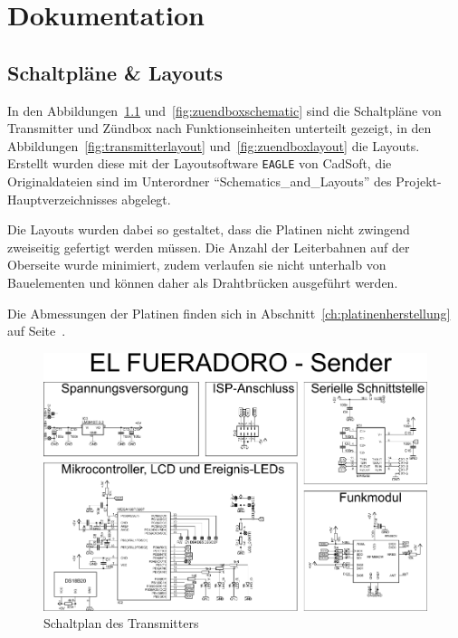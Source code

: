 \documentclass[paper=a4, parskip, numbers=noenddot, toc=listof, headsepline]{scrbook}
\begin{document}
	\part{Dokumentation}
	\label{part:dokumentation}

	\chapter{Schaltpläne \& Layouts}

		In den Abbildungen~\ref{fig:transmitterschematic} und~\ref{fig:zuendboxschematic} sind die Schaltpläne von Transmitter und Zündbox nach Funk\-tions\-ein\-heiten unterteilt gezeigt, in den Abbildungen~\ref{fig:transmitterlayout} und~\ref{fig:zuendboxlayout} die Layouts. Erstellt wurden diese mit der Layoutsoftware \texttt{EAGLE} von CadSoft, die Originaldateien sind im Unterordner \enquote{Schematics\_and\_Layouts} des Projekt-Hauptverzeichnisses abgelegt.

		Die Layouts wurden dabei so gestaltet, dass die Platinen nicht zwingend zweiseitig gefertigt werden müssen. Die Anzahl der Leiterbahnen auf der Oberseite wurde minimiert, zudem verlaufen sie nicht unterhalb von Bauelementen und können daher als Drahtbrücken ausgeführt werden.

		Die Abmessungen der Platinen finden sich in Abschnitt~\ref{ch:platinenherstellung} auf Seite~\pageref{ch:platinenherstellung}.

		\begin{figure}
			\centering
			\includegraphics[angle=-90, width=.9\textwidth, keepaspectratio]{Bilder/Transmitterschaltplan}
			\caption{Schaltplan des Transmitters}
			\label{fig:transmitterschematic}
		\end{figure}
\end{document}
